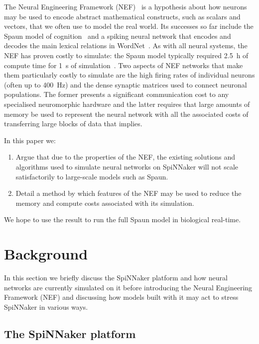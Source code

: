 \documentclass[conference]{IEEEtran}
\begin{document}
The Neural Engineering Framework (NEF)~\parencite{Eliasmith2004} is a hypothesis about how neurons may be used to encode abstract mathematical constructs, such as scalars and vectors, that we often use to model the real world.
Its successes so far include the Spaun model of cognition~\parencite{Eliasmith2012} and a spiking neural network that encodes and decodes the main lexical relations in WordNet~\parencite{Crawford2013}.
As with all neural systems, the NEF has proven costly to simulate: the Spaun model typically required \SI{2.5}{\hour} of compute time for \SI{1}{\second} of simulation~\parencite[\S V]{Stewart2014}.
Two aspects of NEF networks that make them particularly costly to simulate are the high firing rates of individual neurons (often up to \SI{400}{\hertz}) and the dense synaptic matrices used to connect neuronal populations.
The former presents a significant communication cost to any specialised neuromorphic hardware and the latter requires that large amounts of memory be used to represent the neural network with all the associated costs of transferring large blocks of data that implies.

  In this paper we:
  \begin{enumerate}
    \item Argue that due to the properties of the NEF, the existing solutions and algorithms used to simulate neural networks on SpiNNaker will not scale satisfactorily to large-scale models such as Spaun.
    \item Detail a method by which features of the NEF may be used to reduce the memory and compute costs associated with its simulation.
  \end{enumerate}

We hope to use the result to run the full Spaun model in biological real-time.

  \section{Background}

In this section we briefly discuss the SpiNNaker platform and how neural networks are currently simulated on it before introducing the Neural Engineering Framework (NEF) and discussing how models built with it may act to stress SpiNNaker in various ways.

  \subsection{The SpiNNaker platform}
\end{document}
